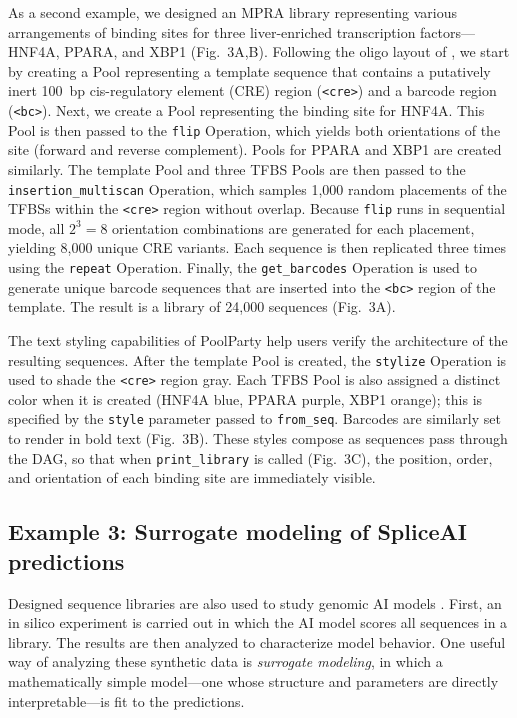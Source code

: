 As a second example, we designed an MPRA library representing various arrangements of binding sites for three liver-enriched transcription factors---HNF4A, PPARA, and XBP1 (Fig.~3A,B). Following the oligo layout of \citet{Melnikov2012dw}, we start by creating a Pool representing a template sequence that contains a putatively inert 100~bp cis-regulatory element (CRE) region (\texttt{<cre>}) and a barcode region (\texttt{<bc>}). Next, we create a Pool representing the binding site for HNF4A. This Pool is then passed to the \texttt{flip} Operation, which yields both orientations of the site (forward and reverse complement). Pools for PPARA and XBP1 are created similarly. The template Pool and three TFBS Pools are then passed to the \texttt{insertion\_multiscan} Operation, which samples 1,000 random placements of the TFBSs within the \texttt{<cre>} region without overlap. Because \texttt{flip} runs in sequential mode, all $2^3 = 8$ orientation combinations are generated for each placement, yielding 8,000 unique CRE variants. Each sequence is then replicated three times using the \texttt{repeat} Operation. Finally, the \texttt{get\_barcodes} Operation is used to generate unique barcode sequences that are inserted into the \texttt{<bc>} region of the template. The result is a library of 24,000 sequences (Fig.~3A).

The text styling capabilities of PoolParty help users verify the architecture of the resulting sequences. After the template Pool is created, the \texttt{stylize} Operation is used to shade the \texttt{<cre>} region gray. Each TFBS Pool is also assigned a distinct color when it is created (HNF4A blue, PPARA purple, XBP1 orange); this is specified by the \texttt{style} parameter passed to \texttt{from\_seq}. Barcodes are similarly set to render in bold text (Fig.~3B). These styles compose as sequences pass through the DAG, so that when \texttt{print\_library} is called (Fig.~3C), the position, order, and orientation of each binding site are immediately visible.

\subsection*{Example 3: Surrogate modeling of SpliceAI predictions}\label{subsec:example3-spliceai}

Designed sequence libraries are also used to study genomic AI models \citep{Avsec2021bpnet, Toneyan2024creme, Seitz2024squid, Nagai2026review}. First, an in silico experiment is carried out in which the AI model scores all sequences in a library. The results are then analyzed to characterize model behavior. One useful way of analyzing these synthetic data is \emph{surrogate modeling}, in which a mathematically simple model---one whose structure and parameters are directly interpretable---is fit to the predictions.

